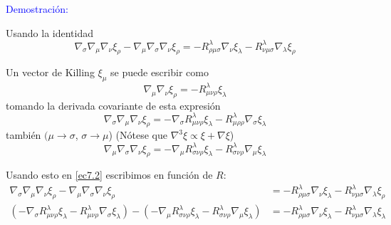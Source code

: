 \documentclass[../main]{subfiles}
\begin{document}
\begin{adjustwidth}{0pt}{-100pt}
\textcolor{blue}{Demostración:}

Usando la identidad
\begin{equation}
    \nabla_{\sigma}\nabla_{\mu}\nabla_{\nu}\xi_{\rho}-\nabla_{\mu}\nabla_{\sigma}\nabla_{\nu}\xi_{\rho} = -R^{\lambda}_{\rho\mu\sigma}\nabla_{\nu}\xi_{\lambda}-R^{\lambda}_{\nu\mu\sigma}\nabla_{\lambda}\xi_{\rho}
    \label{ec7.2}
\end{equation}

Un vector de Killing $\xi_{\mu}$ se puede escribir como 
\begin{equation}
    \nabla_{\mu}\nabla_{\nu}\xi_{\rho}=-R^{\lambda}_{\mu\nu\rho}\xi_{\lambda}
\end{equation}
tomando la derivada covariante de esta expresión
\begin{equation}
    \nabla_{\sigma}\nabla_{\mu}\nabla_{\nu}\xi_{\rho} = -\nabla_{\sigma}R^{\lambda}_{\mu\nu\rho}\xi_{\lambda}-R^{\lambda}_{\mu\rho\rho}\nabla_{\sigma}\xi_{\lambda}
\end{equation}
también $(\mu \rightarrow \sigma$, $\sigma \rightarrow \mu$) (Nótese que $\nabla^3 \xi \propto \xi+\nabla \xi$)
\begin{equation}
    \nabla_{\mu}\nabla_{\sigma}\nabla_{\nu}\xi_{\rho}=-\nabla_{\mu}R^{\lambda}_{\sigma\nu\rho}\xi_{\lambda}-R^{\lambda}_{\sigma\nu\rho}\nabla_{\mu}\xi_{\lambda}
\end{equation}

Usando esto en \eqref{ec7.2} escribimos en función de $R$:
\begin{equation}
    \begin{split}
        \nabla_{\sigma}\nabla_{\mu}\nabla_{\nu}\xi_{\rho}-\nabla_{\mu}\nabla_{\sigma}\nabla_{\nu}\xi_{\rho}&=-R^{\lambda}_{\rho\mu\sigma} \nabla_{\nu}\xi_{\lambda}-R^{\lambda}_{\nu\mu\sigma}\nabla_{\lambda}\xi_{\rho} \\
        (-\nabla_{\sigma}R^{\lambda}_{\mu\nu\rho}\xi_{\lambda}-R^{\lambda}_{\mu\nu\rho}\nabla_{\sigma}\xi_{\lambda})-(-\nabla_{\mu}R^{\lambda}_{\sigma\nu\rho}\xi_{\lambda}-R^{\lambda}_{\sigma\nu\rho}\nabla_{\mu}\xi_{\lambda})&=-R^{\lambda}_{\rho\mu\sigma}\nabla_{\nu}\xi_{\lambda}-R^{\lambda}_{\nu\mu\sigma}\nabla_{\lambda}\xi_{\lambda}
    \end{split}
\end{equation}


\end{adjustwidth}
\end{document}
